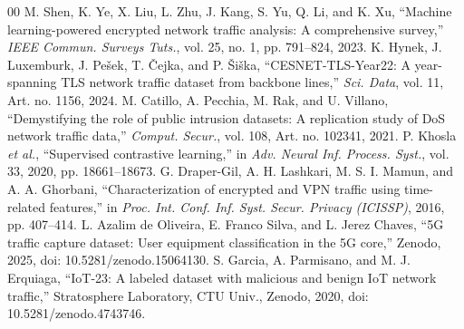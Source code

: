 \documentclass[journal]{IEEEtran}
\begin{document}
\begin{thebibliography}{00}
 M. Shen, K. Ye, X. Liu, L. Zhu, J. Kang, S. Yu, Q. Li, and K. Xu, ``Machine learning-powered encrypted network traffic analysis: A comprehensive survey,'' \emph{IEEE Commun. Surveys Tuts.}, vol. 25, no. 1, pp. 791--824, 2023.
 K. Hynek, J. Luxemburk, J. Pe\v{s}ek, T. \v{C}ejka, and P. \v{S}i\v{s}ka, ``CESNET-TLS-Year22: A year-spanning TLS network traffic dataset from backbone lines,'' \emph{Sci. Data}, vol. 11, Art. no. 1156, 2024.
 M. Catillo, A. Pecchia, M. Rak, and U. Villano, ``Demystifying the role of public intrusion datasets: A replication study of DoS network traffic data,'' \emph{Comput. Secur.}, vol. 108, Art. no. 102341, 2021.
 P. Khosla \emph{et al.}, ``Supervised contrastive learning,'' in \emph{Adv. Neural Inf. Process. Syst.}, vol. 33, 2020, pp. 18661--18673.
 G. Draper-Gil, A. H. Lashkari, M. S. I. Mamun, and A. A. Ghorbani, ``Characterization of encrypted and VPN traffic using time-related features,'' in \emph{Proc. Int. Conf. Inf. Syst. Secur. Privacy (ICISSP)}, 2016, pp. 407--414.
 L. Azalim de Oliveira, E. Franco Silva, and L. Jerez Chaves, ``5G traffic capture dataset: User equipment classification in the 5G core,'' Zenodo, 2025, doi: 10.5281/zenodo.15064130.
 S. Garcia, A. Parmisano, and M. J. Erquiaga, ``IoT-23: A labeled dataset with malicious and benign IoT network traffic,'' Stratosphere Laboratory, CTU Univ., Zenodo, 2020, doi: 10.5281/zenodo.4743746.
\end{thebibliography}
\end{document}

